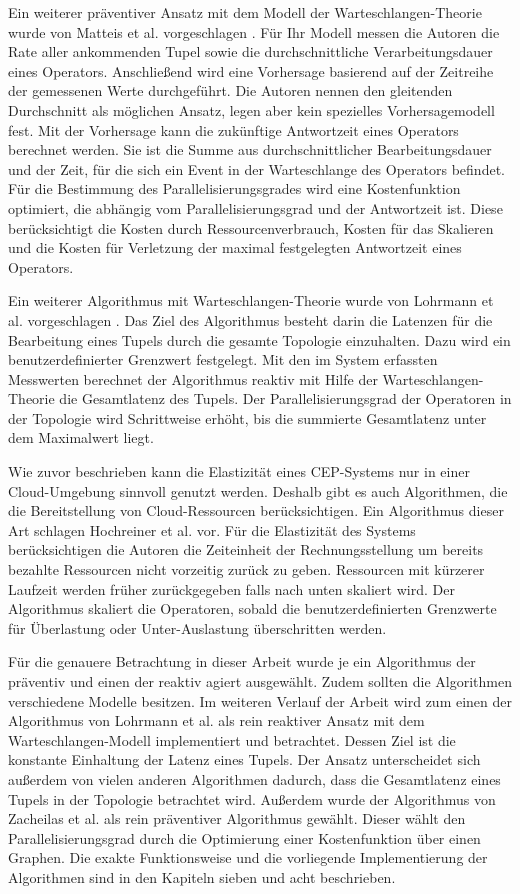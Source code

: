 Ein weiterer präventiver Ansatz mit dem Modell der Warteschlangen-Theorie wurde von Matteis et al. vorgeschlagen \cite{matteis_elastic_2017}.
Für Ihr Modell messen die Autoren die Rate aller ankommenden Tupel sowie die durchschnittliche Verarbeitungsdauer eines Operators.
Anschließend wird eine Vorhersage basierend auf der Zeitreihe der gemessenen Werte durchgeführt. 
Die Autoren nennen den gleitenden Durchschnitt als möglichen Ansatz, legen aber kein spezielles Vorhersagemodell fest. 
Mit der Vorhersage kann die zukünftige Antwortzeit eines Operators berechnet werden.
Sie ist die Summe aus durchschnittlicher Bearbeitungsdauer und der Zeit, für die sich ein Event in der Warteschlange des Operators befindet.
Für die Bestimmung des Parallelisierungsgrades wird eine Kostenfunktion optimiert, die abhängig vom Parallelisierungsgrad und der Antwortzeit ist.
Diese berücksichtigt die Kosten durch Ressourcenverbrauch, Kosten für das Skalieren und die Kosten für Verletzung der maximal festgelegten Antwortzeit eines Operators. 

Ein weiterer Algorithmus mit Warteschlangen-Theorie wurde von Lohrmann et al. vorgeschlagen \cite{lohrmann_elastic_2015}.
Das Ziel des Algorithmus besteht darin die Latenzen für die Bearbeitung eines Tupels durch die gesamte Topologie einzuhalten.
Dazu wird ein benutzerdefinierter Grenzwert festgelegt.
Mit den im System erfassten Messwerten berechnet der Algorithmus reaktiv mit Hilfe der Warteschlangen-Theorie die Gesamtlatenz des Tupels.
Der Parallelisierungsgrad der Operatoren in der Topologie wird Schrittweise erhöht, bis die summierte Gesamtlatenz unter dem Maximalwert liegt.

Wie zuvor beschrieben kann die Elastizität eines CEP-Systems nur in einer Cloud-Umgebung sinnvoll genutzt werden.
Deshalb gibt es auch Algorithmen, die die Bereitstellung von Cloud-Ressourcen berücksichtigen.
Ein Algorithmus dieser Art schlagen Hochreiner et al. vor.
Für die Elastizität des Systems berücksichtigen die Autoren die Zeiteinheit der Rechnungsstellung um bereits bezahlte Ressourcen nicht vorzeitig zurück zu geben.
Ressourcen mit kürzerer Laufzeit werden früher zurückgegeben falls nach unten skaliert wird.
Der Algorithmus skaliert die Operatoren, sobald die benutzerdefinierten Grenzwerte für Überlastung oder Unter-Auslastung überschritten werden.

Für die genauere Betrachtung in dieser Arbeit wurde je ein Algorithmus der präventiv und einen der reaktiv agiert ausgewählt.
Zudem sollten die Algorithmen verschiedene Modelle besitzen.
Im weiteren Verlauf der Arbeit wird zum einen der Algorithmus von Lohrmann et al. als rein reaktiver Ansatz mit dem Warteschlangen-Modell implementiert und betrachtet.
Dessen Ziel ist die konstante Einhaltung der Latenz eines Tupels.
Der Ansatz unterscheidet sich außerdem von vielen anderen Algorithmen dadurch, dass die Gesamtlatenz eines Tupels in der Topologie betrachtet wird.
Außerdem wurde der Algorithmus von Zacheilas et al. als rein präventiver Algorithmus gewählt.
Dieser wählt den Parallelisierungsgrad durch die Optimierung einer Kostenfunktion über einen Graphen.
Die exakte Funktionsweise und die vorliegende Implementierung der Algorithmen sind in den Kapiteln sieben und acht beschrieben.




